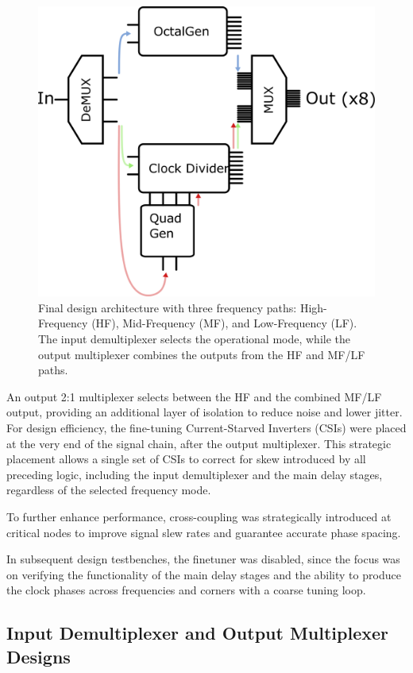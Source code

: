 \begin{figure}[H]
  \centering
  \includegraphics[width=0.8\linewidth]{figures/Schematics/mixF_design.png}
  \caption{Final design architecture with three frequency paths: High-Frequency (HF), Mid-Frequency (MF), and Low-Frequency (LF). The input demultiplexer selects the operational mode, while the output multiplexer combines the outputs from the HF and MF/LF paths.}
  \label{fig:mixF_design}
\end{figure}

An output 2:1 multiplexer selects between the HF and the combined MF/LF output, providing an additional layer of isolation to reduce noise and lower jitter. For design efficiency, the fine-tuning Current-Starved Inverters (CSIs) were placed at the very end of the signal chain, after the output multiplexer. This strategic placement allows a single set of CSIs to correct for skew introduced by all preceding logic, including the input demultiplexer and the main delay stages, regardless of the selected frequency mode.

To further enhance performance, cross-coupling was strategically introduced at critical nodes to improve signal slew rates and guarantee accurate phase spacing.

In subsequent design testbenches, the finetuner was disabled, since the focus was on verifying the functionality of the main delay stages and the ability to produce the clock phases across frequencies and corners with a coarse tuning loop.

\subsection*{Input Demultiplexer and Output Multiplexer Designs}\label{sec:demux_mux_design}

